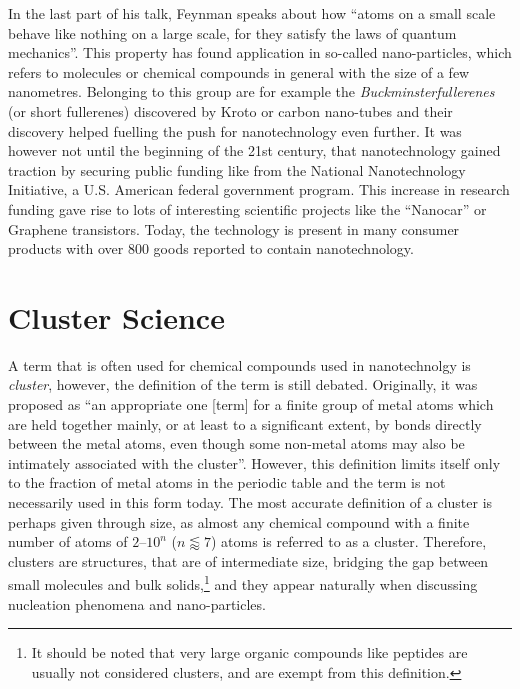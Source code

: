 In the last part of his talk, Feynman speaks about how ``atoms on a small scale
behave like nothing on a large scale, for they satisfy the laws of quantum
mechanics''. This property has found application in so-called nano-particles,
which refers to molecules or chemical compounds in general with the size of a
few nanometres. Belonging to this group are for example the
\emph{Buckminsterfullerenes} (or short fullerenes) discovered by
Kroto\autocite{Kroto_C60Buckminsterfullerene_1985} or carbon
nano-tubes\autocite{Iijima_Helicalmicrotubulesgraphitic_1991} and their
discovery helped fuelling the push for nanotechnology even further. It was
however not until the beginning of the 21st century, that nanotechnology gained
traction by securing public funding like from the National Nanotechnology
Initiative, a U.S. American federal government program. This increase in
research funding gave rise to lots of interesting scientific projects like the
``Nanocar''\autocite{Kudernac_Electricallydrivendirectional_2011} or Graphene
transistors.\autocite{Wu_Highfrequencyscaledgraphene_2011} Today, the technology
is present in many consumer products with over 800 goods reported to contain
nanotechnology.\autocite{Vance_Nanotechnologyrealworld_2015}

\section{Cluster Science}
\label{sec:ClusterScience}

A term that is often used for chemical compounds used in nanotechnolgy is
\emph{cluster}, however, the definition of the term is still debated.
Originally, it was proposed as ``an appropriate one [term] for a finite group of
metal atoms which are held together mainly, or at least to a significant extent,
by bonds directly between the metal atoms, even though some non-metal atoms may
also be intimately associated with the
cluster''.\autocite{Cotton_MetalAtomClusters_1964} However, this definition
limits itself only to the fraction of metal atoms in the periodic table and the
term is not necessarily used in this form today. The most accurate definition of
a cluster is perhaps given through size, as almost any chemical compound with a
finite number of atoms of $2$--$10^n$ ($n\lessapprox 7$) atoms is referred to as
a
cluster.\autocite{Johnston_Atomicmolecularclusters_2002,Wales_Energylandscapes_2003}
Therefore, clusters are structures, that are of intermediate size, bridging the
gap between small molecules and bulk solids,\footnote{It should be noted that
very large organic compounds like peptides are usually not considered clusters,
and are exempt from this definition.} and they appear naturally when discussing
nucleation phenomena and nano-particles. 

